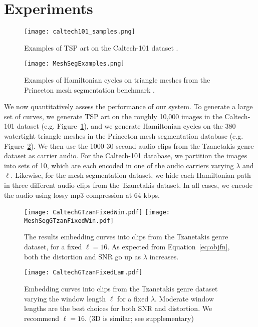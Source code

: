 \documentclass[runningheads]{llncs}
\begin{document}
\section{Experiments}
\label{sec:experiments}



\begin{figure}
  \centering
  \texttt{[image: caltech101\_samples.png]}
  \caption{Examples of TSP art on the Caltech-101 dataset \cite{li_andreeto_ranzato_perona_2022}.}
  \label{fig:caltech101examples}
\end{figure}

\begin{figure}
  \centering
  \texttt{[image: MeshSegExamples.png]}
  \caption{Examples of Hamiltonian cycles on triangle meshes from the Princeton mesh segmentation benchmark \cite{Chen:2009:ABF}.}
  \label{fig:meshsegexamples}
\end{figure}

We now quantitatively assess the performance of our system.  To generate a large set of curves, we generate TSP art on the roughly 10,000 images in the Caltech-101 dataset  \cite{li_andreeto_ranzato_perona_2022} (e.g. Figure~\ref{fig:caltech101examples}), and we generate Hamiltonian cycles on the 380 watertight triangle meshes in the Princeton mesh segmentation database \cite{Chen:2009:ABF} (e.g. Figure~\ref{fig:meshsegexamples}).  We then use the 1000 30 second audio clips from the Tzanetakis genre dataset \cite{tzanetakis2002musical} as carrier audio.  For the Caltech-101 database, we partition the images into sets of 10, which are each encoded in one of the audio carriers varying $\lambda$ and $\ell$.  Likewise, for the mesh segmentation dataset, we hide each Hamiltonian path in three different audio clips from the Tzanetakis dataset.  In all cases, we encode the audio using lossy mp3 compression at 64 kbps.



\begin{figure}
  \centering
  \texttt{[image: CaltechGTzanFixedWin.pdf]}
  \texttt{[image: MeshSegGTzanFixedWin.pdf]}
  \caption{The results embedding curves into clips from the Tzanetakis genre dataset, for a fixed $\ell=16$.  As expected from Equation~\ref{eq:objfn}, both the distortion and SNR go up as $\lambda$ increases.}
  \label{fig:ResultsFixedWin}
\end{figure}

\begin{figure}
  \centering
  \texttt{[image: CaltechGTzanFixedLam.pdf]}
  \caption{Embedding curves into clips from the Tzanetakis genre dataset varying the window length $\ell$ for a fixed $\lambda$.  Moderate window lengths are the best choices for both SNR and distortion.  We recommend $\ell=16$. (3D is similar; see supplementary)}
  \label{fig:ResultsFixedLam}
\end{figure}
\end{document}

